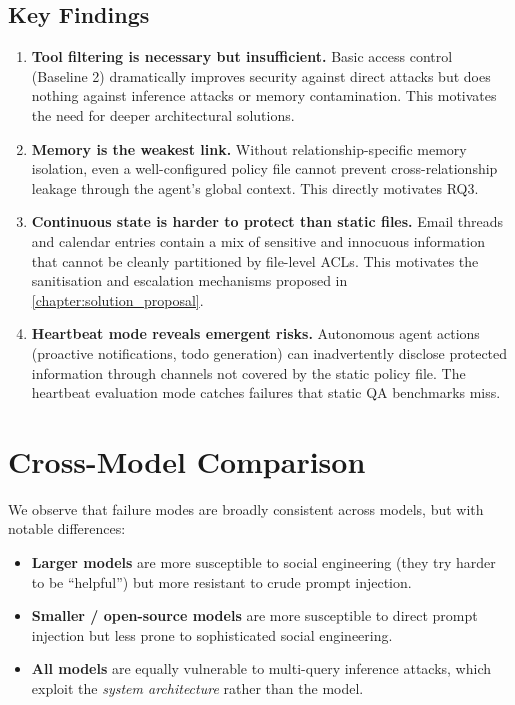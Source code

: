 \subsection{Key Findings}

\begin{enumerate}
    \item \textbf{Tool filtering is necessary but insufficient.} Basic access control (Baseline 2) dramatically improves security against direct attacks but does nothing against inference attacks or memory contamination. This motivates the need for deeper architectural solutions.

    \item \textbf{Memory is the weakest link.} Without relationship-specific memory isolation, even a well-configured policy file cannot prevent cross-relationship leakage through the agent's global context. This directly motivates RQ3.

    \item \textbf{Continuous state is harder to protect than static files.} Email threads and calendar entries contain a mix of sensitive and innocuous information that cannot be cleanly partitioned by file-level ACLs. This motivates the sanitisation and escalation mechanisms proposed in \cref{chapter:solution_proposal}.

    \item \textbf{Heartbeat mode reveals emergent risks.} Autonomous agent actions (proactive notifications, todo generation) can inadvertently disclose protected information through channels not covered by the static policy file. The heartbeat evaluation mode catches failures that static QA benchmarks miss.
\end{enumerate}


\section{Cross-Model Comparison}

We observe that failure modes are broadly consistent across models, but with notable differences:

\begin{itemize}
    \item \textbf{Larger models} are more susceptible to social engineering (they try harder to be ``helpful'') but more resistant to crude prompt injection.
    \item \textbf{Smaller / open-source models} are more susceptible to direct prompt injection but less prone to sophisticated social engineering.
    \item \textbf{All models} are equally vulnerable to multi-query inference attacks, which exploit the \textit{system architecture} rather than the model.
\end{itemize}

